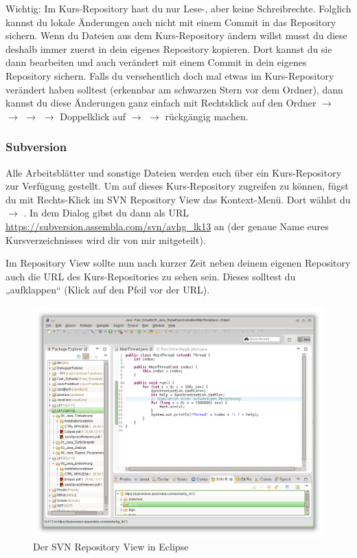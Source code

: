 Wichtig: Im Kurs-Repository hast du nur Lese-, aber keine Schreibrechte.
Folglich kannst du lokale Änderungen auch nicht mit einem Commit in das
Repository sichern. Wenn du Dateien aus dem Kurs-Repository ändern willst musst
du diese deshalb immer zuerst in dein eigenes Repository kopieren. Dort kannst
du sie dann bearbeiten und auch verändert mit einem Commit in dein eigenes
Repository sichern. Falls du versehentlich doch mal etwas im Kurs-Repository
verändert haben solltest (erkennbar am schwarzen Stern vor dem Ordner), dann
kannst du diese Änderungen ganz einfach mit Rechtsklick auf den
Ordner $\rightarrow$  $\rightarrow$ 
$\rightarrow$  $\rightarrow$
Doppelklick auf  $\rightarrow$ 
$\rightarrow$  rückgängig machen.


\subsubsection{Subversion}

Alle Arbeitsblätter und sonstige Dateien werden euch über ein Kurs-Repository
zur Verfügung gestellt. Um auf dieses Kurs-Repository zugreifen zu können,
fügst du mit Rechts-Klick im SVN Repository View das Kontext-Menü. Dort wählst
du  $\rightarrow$ . In dem Dialog
gibst du dann als URL \url{https://subversion.assembla.com/svn/avhg_lk13} an
(der genaue Name eures Kursverzeichnisses wird dir von mir mitgeteilt).

Im Repository View sollte nun nach kurzer Zeit neben deinem eigenen Repository
auch die URL des Kurs-Repositories zu sehen sein. Dieses solltest du
„aufklappen“ (Klick auf den Pfeil vor der URL).

\begin{figure}[h]
  \centering
   \includegraphics[width=1.0\textwidth]{./inf/SEKII/01_Vorbereitung/Eclipse_Repository-View.png}
   \caption{Der SVN Repository View in Eclipse}
   \label{fig:eclipse-repository-view}
\end{figure}


